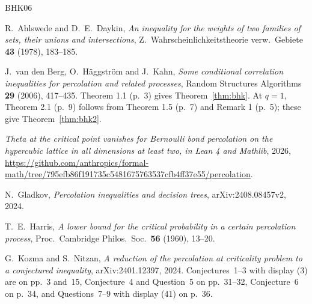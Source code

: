 \documentclass[11pt]{article}
\theoremstyle{definition}
\theoremstyle{remark}
\begin{document}
\begin{thebibliography}{BHK06}
\setlength{\itemsep}{1pt}\setlength{\parskip}{0pt}

 R.~Ahlswede and D.~E.~Daykin, \emph{An inequality for the weights of two
families of sets, their unions and intersections}, Z.~Wahrscheinlichkeitstheorie verw.\
Gebiete \textbf{43} (1978), 183--185.

 J.~van den Berg, O.~H\"aggstr\"om and J.~Kahn, \emph{Some conditional
correlation inequalities for percolation and related processes}, Random Structures
Algorithms \textbf{29} (2006), 417--435. Theorem 1.1 (p.~3) gives
Theorem~\ref{thm:bhk}. At $q=1$, Theorem 2.1 (p.~9) follows from Theorem 1.5 (p.~7) and
Remark 1 (p.~5); these give Theorem~\ref{thm:bhk2}.

 \emph{Theta at the critical point vanishes for Bernoulli bond
percolation on the hypercubic lattice in all dimensions at least two, in Lean 4 and
Mathlib}, 2026, \url{https://github.com/anthropics/formal-math/tree/795efb86f191735c5481675763537cfb4ff37e55/percolation}.

 N.~Gladkov, \emph{Percolation inequalities and decision trees},
arXiv:2408.08457v2, 2024.

 T.~E.~Harris, \emph{A lower bound for the critical probability in a certain
percolation process}, Proc.\ Cambridge Philos.\ Soc.\ \textbf{56} (1960), 13--20.

 G.~Kozma and S.~Nitzan, \emph{A reduction of the percolation at
criticality problem to a conjectured inequality}, arXiv:2401.12397, 2024. Conjectures~1--3
with display (3) are on pp.~3 and~15, Conjecture~4 and Question~5 on pp.~31--32,
Conjecture~6 on p.~34, and Questions~7--9 with display (41) on p.~36.

\end{thebibliography}
\end{document}

